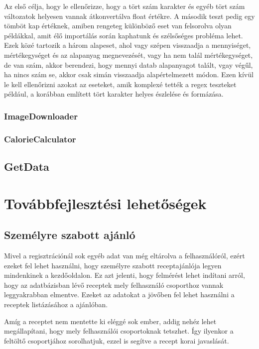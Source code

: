 \documentclass[12pt]{report}
\theoremstyle{definition}
\begin{document}
Az első célja, hogy le ellenőrizze, hogy a tört szám karakter és egyéb tört szám változatok helyesen vannak átkonvertálva float értékre. A második teszt pedig egy tömböt kap értéknek, amiben rengeteg különböző eset van felsorolva olyan példákkal, amit élő importálás során kaphatunk és szélsőséges probléma lehet. Ezek közé tartozik a három alapeset, ahol vagy szépen visszaadja a mennyiséget, mértékegységet és az alapanyag megnevezését, vagy ha nem talál mértékegységet, de van szám, akkor berendezi, hogy mennyi datab alapanyagot talált, vgay végűl, ha nincs szám se, akkor csak simán visszaadja alapértelmezett módon. Ezen kívül le kell ellenőrizni azokat az eseteket, amik komplexé tették a regex teszteket például, a korábban említett tört karakter helyes észlelése és formázása.

\subsection{ImageDownloader}

\subsection{CalorieCalculator}

\section{GetData}

\chapter{Továbbfejlesztési lehetőségek}
\section{Személyre szabott ajánló}
Mivel a regisztrációnál sok egyéb adat van még eltárolva a felhasználóról, ezért ezeket fel lehet használni, hogy személyre szabott receptajánlója legyen mindenkinek a kezdőoldalon. Ez azt jelenti, hogy felmérést lehet indítani arról, hogy az adatbázisban lévő receptek mely felhasználó csoporthoz vannak leggyakrabban elmentve. Ezeket az adatokat a jövőben fel lehet használni a  receptek listázásához a ajánlóban. 

Amíg a receptet nem mentette ki eléggé sok ember, addig nehéz lehet megállapítani, hogy mely felhasználói csoportoknak tetszhet. Így ilyenkor a feltöltő csoportjához sorolhatjuk, ezzel is segítve a recept korai javaslását.
\end{document}
